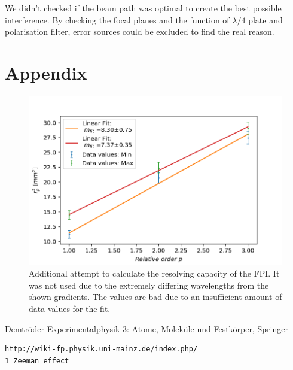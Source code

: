 \documentclass[]{article}
\begin{document}
We didn't checked if the beam path was optimal to create the best possible interference. By checking the focal planes and the function of $\lambda/4$ plate and polarisation filter, error sources could be excluded to find the real reason.


\newpage
\section{Appendix}
\begin{figure}[H]
\centering
\includegraphics[width=1\textwidth]{Plots/Res_Cap.png}
\caption{Additional attempt to calculate the resolving capacity of the FPI. It was not used due to the extremely differing wavelengths from the shown gradients. The values are bad due to an insufficient amount of data values for the fit.}
\label{fig: not used}
\end{figure}


\newpage
\begin{thebibliography}{}
 Demtröder Experimentalphysik 3: Atome, Moleküle und Festkörper, Springer

 \begin{verbatim}
http://wiki-fp.physik.uni-mainz.de/index.php/
1_Zeeman_effect
\end{verbatim} 


\end{thebibliography}
\end{document}
